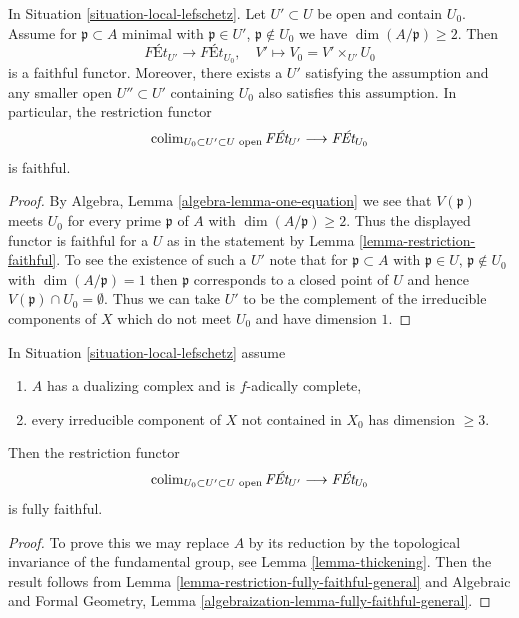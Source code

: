 \begin{lemma}
\label{lemma-faithful-general}
In Situation \ref{situation-local-lefschetz}. Let $U' \subset U$
be open and contain $U_0$. Assume for $\mathfrak p \subset A$ minimal
with $\mathfrak p \in U'$, $\mathfrak p \not \in U_0$ we have
$\dim(A/\mathfrak p) \geq 2$. Then
$$
\textit{F\'Et}_{U'} \longrightarrow \textit{F\'Et}_{U_0},\quad
V' \longmapsto V_0 = V' \times_{U'} U_0
$$
is a faithful functor. Moreover, there exists a $U'$ satisfying
the assumption and any smaller open $U'' \subset U'$ containing
$U_0$ also satisfies this assumption. In particular, the restriction
functor
$$
\mathop{\mathrm{colim}}\nolimits_{U_0 \subset U' \subset U\text{ open}} \textit{F\'Et}_{U'}
\longrightarrow
\textit{F\'Et}_{U_0}
$$
is faithful.
\end{lemma}

\begin{proof}
By Algebra, Lemma \ref{algebra-lemma-one-equation}
we see that $V(\mathfrak p)$ meets $U_0$ for
every prime $\mathfrak p$ of $A$ with $\dim(A/\mathfrak p) \geq 2$.
Thus the displayed functor is faithful for a $U$ as in the statement
by Lemma \ref{lemma-restriction-faithful}.
To see the existence of such a $U'$ note that for
$\mathfrak p \subset A$ with $\mathfrak p \in U$,
$\mathfrak p \not \in U_0$ with $\dim(A/\mathfrak p) = 1$
then $\mathfrak p$ corresponds to a closed point of $U$
and hence $V(\mathfrak p) \cap U_0 = \emptyset$.
Thus we can take $U'$ to be the complement of the irreducible
components of $X$ which do not meet $U_0$ and have dimension $1$.
\end{proof}

\begin{lemma}
\label{lemma-fully-faithful-general-better}
In Situation \ref{situation-local-lefschetz} assume
\begin{enumerate}
\item $A$ has a dualizing complex and is $f$-adically complete,
\item every irreducible component of $X$ not contained in $X_0$
has dimension $\geq 3$.
\end{enumerate}
Then the restriction functor
$$
\mathop{\mathrm{colim}}\nolimits_{U_0 \subset U' \subset U\text{ open}} \textit{F\'Et}_{U'}
\longrightarrow
\textit{F\'Et}_{U_0}
$$
is fully faithful.
\end{lemma}

\begin{proof}
To prove this we may replace $A$ by its reduction by the topological
invariance of the fundamental group, see Lemma \ref{lemma-thickening}.
Then the result follows from
Lemma \ref{lemma-restriction-fully-faithful-general}
and Algebraic and Formal Geometry, Lemma
\ref{algebraization-lemma-fully-faithful-general}.
\end{proof}

